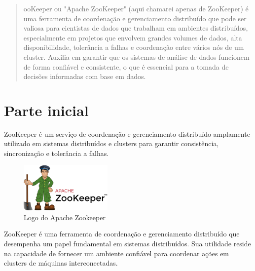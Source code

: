 \documentclass[a4paper,11pt]{article}
\begin{document}
	
	\maketitle %
	\thispagestyle{fancy} %
	
\begin{abstract}
	ooKeeper\cite{zookeeperoficial} ou "Apache ZooKeeper" (aqui chamarei apenas de ZooKeeper) é uma ferramenta de coordenação e gerenciamento distribuído que pode ser valiosa para cientistas de dados que trabalham em ambientes distribuídos, especialmente em projetos que envolvem grandes volumes de dados, alta disponibilidade, tolerância a falhas e coordenação entre vários nós de um cluster. Auxilia em garantir que os sistemas de análise de dados funcionem de forma confiável e consistente, o que é essencial para a tomada de decisões informadas com base em dados.
\end{abstract}

\section{Parte inicial}
ZooKeeper é um serviço de coordenação e gerenciamento distribuído amplamente utilizado em sistemas distribuídos e clusters para garantir consistência, sincronização e tolerância a falhas. 

\begin{figure}[H]
	\centering
	\includegraphics[width=0.4\textwidth]{imagem/logo}
	\caption{Logo do Apache Zookeeper}
\end{figure}

ZooKeeper é uma ferramenta de coordenação e gerenciamento distribuído que desempenha um papel fundamental em sistemas distribuídos. Sua utilidade reside na capacidade de fornecer um ambiente confiável para coordenar ações em clusters de máquinas interconectadas.
\end{document}
